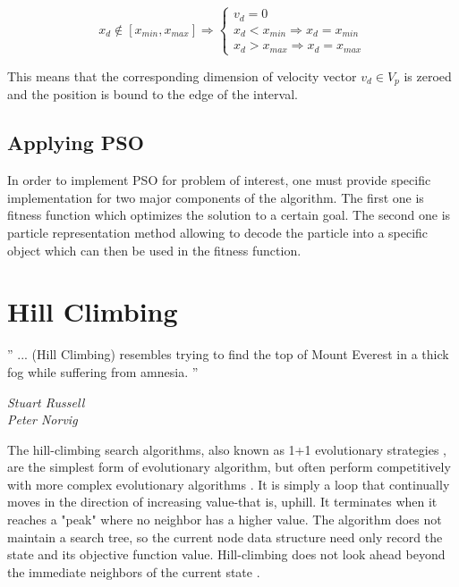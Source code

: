 \documentclass{mini}
\begin{document}
\[
x_{d} \notin [x_{min}, x_{max}] \Rightarrow \left \{
\begin{array}{ll}
v_{d} = 0 \\
x_d < x_{min} \Rightarrow x_d = x_{min} \\
x_d > x_{max} \Rightarrow x_d = x_{max}
\end{array}
\right.
\]

This means that the corresponding dimension of velocity vector $v_d \in V_p$ is zeroed and the position is bound to the edge of the interval.

\section{Applying PSO}
In order to implement PSO for problem of interest, one must provide specific implementation for two major components of the algorithm. The first one is fitness function which optimizes the solution to a certain goal. The second one is particle representation method allowing to decode the particle into a specific object which can then be used in the fitness function.


\chapter{Hill Climbing}\label{chap:classification}

\epigraph{'' ... (Hill Climbing) resembles trying to find the top of Mount Everest in a thick fog while suffering from amnesia. ''}{\textit{Stuart Russell \\ Peter Norvig }}

\bigskip

The hill-climbing search algorithms, also known as 1+1 evolutionary strategies \cite{hc_1}, are the simplest form of evolutionary algorithm, but often perform competitively with more complex evolutionary algorithms \cite{hc_2}. It is simply a loop that continually moves in the direction of increasing value-that is, uphill. It terminates when it reaches a "peak" where no neighbor has a higher value. The algorithm does not maintain a search tree, so the current node data structure need only record the state and its objective function value. Hill-climbing does not look ahead beyond the immediate neighbors of the current state \cite{hc_3}.
\end{document}
